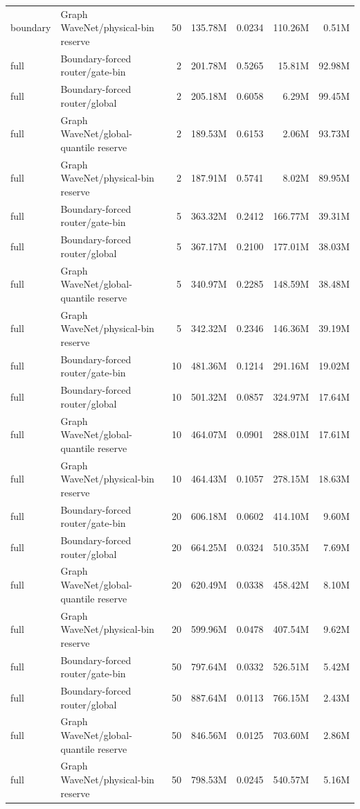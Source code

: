 \begin{tabular}{llrrrrr}
boundary & Graph WaveNet/physical-bin reserve & 50 & 135.78M & 0.0234 & 110.26M & 0.51M \\
full & Boundary-forced router/gate-bin & 2 & 201.78M & 0.5265 & 15.81M & 92.98M \\
full & Boundary-forced router/global & 2 & 205.18M & 0.6058 & 6.29M & 99.45M \\
full & Graph WaveNet/global-quantile reserve & 2 & 189.53M & 0.6153 & 2.06M & 93.73M \\
full & Graph WaveNet/physical-bin reserve & 2 & 187.91M & 0.5741 & 8.02M & 89.95M \\
full & Boundary-forced router/gate-bin & 5 & 363.32M & 0.2412 & 166.77M & 39.31M \\
full & Boundary-forced router/global & 5 & 367.17M & 0.2100 & 177.01M & 38.03M \\
full & Graph WaveNet/global-quantile reserve & 5 & 340.97M & 0.2285 & 148.59M & 38.48M \\
full & Graph WaveNet/physical-bin reserve & 5 & 342.32M & 0.2346 & 146.36M & 39.19M \\
full & Boundary-forced router/gate-bin & 10 & 481.36M & 0.1214 & 291.16M & 19.02M \\
full & Boundary-forced router/global & 10 & 501.32M & 0.0857 & 324.97M & 17.64M \\
full & Graph WaveNet/global-quantile reserve & 10 & 464.07M & 0.0901 & 288.01M & 17.61M \\
full & Graph WaveNet/physical-bin reserve & 10 & 464.43M & 0.1057 & 278.15M & 18.63M \\
full & Boundary-forced router/gate-bin & 20 & 606.18M & 0.0602 & 414.10M & 9.60M \\
full & Boundary-forced router/global & 20 & 664.25M & 0.0324 & 510.35M & 7.69M \\
full & Graph WaveNet/global-quantile reserve & 20 & 620.49M & 0.0338 & 458.42M & 8.10M \\
full & Graph WaveNet/physical-bin reserve & 20 & 599.96M & 0.0478 & 407.54M & 9.62M \\
full & Boundary-forced router/gate-bin & 50 & 797.64M & 0.0332 & 526.51M & 5.42M \\
full & Boundary-forced router/global & 50 & 887.64M & 0.0113 & 766.15M & 2.43M \\
full & Graph WaveNet/global-quantile reserve & 50 & 846.56M & 0.0125 & 703.60M & 2.86M \\
full & Graph WaveNet/physical-bin reserve & 50 & 798.53M & 0.0245 & 540.57M & 5.16M \\
\bottomrule
\end{tabular}
